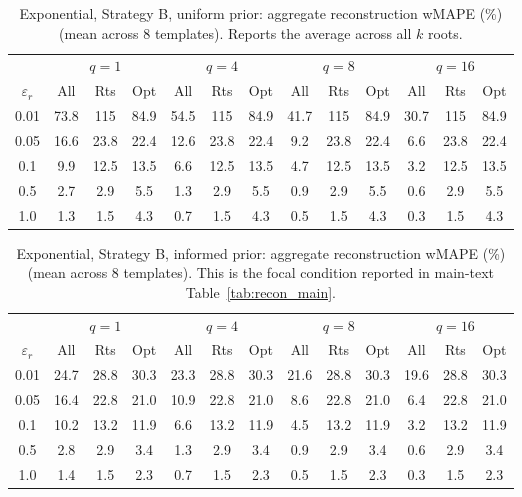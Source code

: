 \begin{table}[h]
\centering
\setlength{\tabcolsep}{2.5pt}
\small
\caption{Exponential, Strategy B, uniform prior: aggregate reconstruction wMAPE (\%) (mean across 8 templates). Reports the average across all $k$ roots.}
\label{tab:rq2_exp_B_uniform}
\begin{tabular}{c|ccc|ccc|ccc|ccc}
\toprule
& \multicolumn{3}{c|}{$q=1$} & \multicolumn{3}{c|}{$q=4$} & \multicolumn{3}{c|}{$q=8$} & \multicolumn{3}{c}{$q=16$} \\
$\varepsilon_r$ & All & Rts & Opt & All & Rts & Opt & All & Rts & Opt & All & Rts & Opt \\
\midrule
0.01 & 73.8 & 115  & 84.9 & 54.5 & 115  & 84.9 & 41.7 & 115  & 84.9 & 30.7 & 115  & 84.9 \\
0.05 & 16.6 & 23.8 & 22.4 & 12.6 & 23.8 & 22.4 & 9.2  & 23.8 & 22.4 & 6.6  & 23.8 & 22.4 \\
0.1  & 9.9  & 12.5 & 13.5 & 6.6  & 12.5 & 13.5 & 4.7  & 12.5 & 13.5 & 3.2  & 12.5 & 13.5 \\
0.5  & 2.7  & 2.9  & 5.5  & 1.3  & 2.9  & 5.5  & 0.9  & 2.9  & 5.5  & 0.6  & 2.9  & 5.5 \\
1.0  & 1.3  & 1.5  & 4.3  & 0.7  & 1.5  & 4.3  & 0.5  & 1.5  & 4.3  & 0.3  & 1.5  & 4.3 \\
\bottomrule
\end{tabular}
\end{table}

\begin{table}[h]
\centering
\setlength{\tabcolsep}{2.5pt}
\small
\caption{Exponential, Strategy B, informed prior: aggregate reconstruction wMAPE (\%) (mean across 8 templates). This is the focal condition reported in main-text Table~\ref{tab:recon_main}.}
\label{tab:rq2_exp_B_informed}
\begin{tabular}{c|ccc|ccc|ccc|ccc}
\toprule
& \multicolumn{3}{c|}{$q=1$} & \multicolumn{3}{c|}{$q=4$} & \multicolumn{3}{c|}{$q=8$} & \multicolumn{3}{c}{$q=16$} \\
$\varepsilon_r$ & All & Rts & Opt & All & Rts & Opt & All & Rts & Opt & All & Rts & Opt \\
\midrule
0.01 & 24.7 & 28.8 & 30.3 & 23.3 & 28.8 & 30.3 & 21.6 & 28.8 & 30.3 & 19.6 & 28.8 & 30.3 \\
0.05 & 16.4 & 22.8 & 21.0 & 10.9 & 22.8 & 21.0 & 8.6  & 22.8 & 21.0 & 6.4  & 22.8 & 21.0 \\
0.1  & 10.2 & 13.2 & 11.9 & 6.6  & 13.2 & 11.9 & 4.5  & 13.2 & 11.9 & 3.2  & 13.2 & 11.9 \\
0.5  & 2.8  & 2.9  & 3.4  & 1.3  & 2.9  & 3.4  & 0.9  & 2.9  & 3.4  & 0.6  & 2.9  & 3.4 \\
1.0  & 1.4  & 1.5  & 2.3  & 0.7  & 1.5  & 2.3  & 0.5  & 1.5  & 2.3  & 0.3  & 1.5  & 2.3 \\
\bottomrule
\end{tabular}
\end{table}

